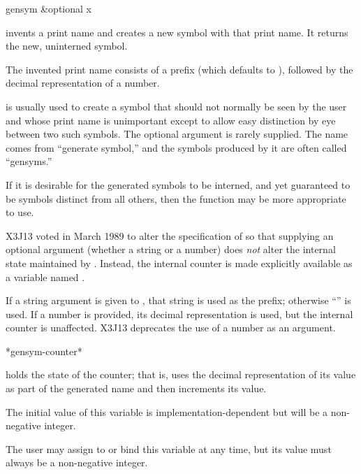\begin{defun}[Function]
gensym &optional x

 invents a print name and creates a new symbol with that print name.
It returns the new, uninterned symbol.

The invented print name consists of a prefix
(which defaults to ), followed by the decimal representation of a number.

 is usually used to create a symbol that should not normally
be seen by the user and whose print name is unimportant except to
allow easy distinction by eye between two such symbols.
The optional argument is rarely supplied.
The name comes from ``generate symbol,'' and the symbols produced by it
are often called ``gensyms.''

If it is desirable
for the generated symbols to be interned, and yet guaranteed to be
symbols distinct from all others,
then the function 
may be more appropriate to use.

\begin{newer}
X3J13 voted in March 1989 
to alter the specification of  so that supplying an
optional argument (whether a string or a number) does \emph{not} alter
the internal state maintained by .
Instead, the internal
counter is made explicitly available as a variable named .

If a string argument is given to , that string is used as the prefix;
otherwise ``'' is used.  If a number is provided, its decimal
representation is used, but the internal counter is unaffected.
X3J13 deprecates the use of a number as an argument.
\end{newer}
\end{defun}

\begin{defun}[Variable]
*gensym-counter*

holds the state of the  counter; that is, 
uses the decimal representation of its value as part of the generated name
and then increments its value.

The initial value of this variable is implementation-dependent
but will be a non-negative integer.

The user may assign to or bind this variable at any time, but its value
must always be a non-negative integer.
\end{defun}

